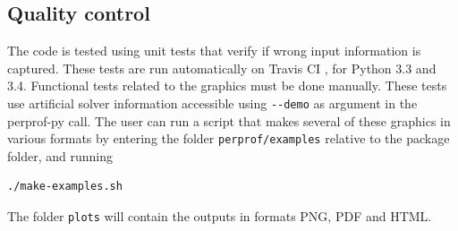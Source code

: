 \subsection*{Quality control}

    The code is tested using unit tests that verify if wrong input information
    is captured. These tests are run automatically on Travis CI
    \cite{url:travis}, for Python 3.3 and 3.4.
    Functional tests related to the graphics must be done manually.
    These tests use artificial solver information accessible using \verb+--demo+
    as argument in the perprof-py call. The user can run a script that makes
    several of these graphics in various formats by entering the folder
    \verb+perprof/examples+ relative to the package folder, and running
\begin{verbatim}
./make-examples.sh
\end{verbatim}
    The folder \verb+plots+ will contain the outputs in formats PNG, PDF and HTML.
